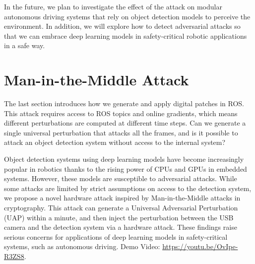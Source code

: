 In the future, we plan to investigate the effect of the attack on modular autonomous driving systems that rely on object detection models to perceive the environment. In addition, we will explore how to detect adversarial attacks so that we can embrace deep learning models in safety-critical robotic applications in a safe way.

\section{Man-in-the-Middle Attack}

The last section introduces how we generate and apply digital patches in ROS. This attack requires access to ROS topics and online gradients, which means different perturbations are computed at different time steps. Can we generate a single universal perturbation that attacks all the frames, and is it possible to attack an object detection system without access to the internal system? 


Object detection systems using deep learning models have become increasingly popular in robotics thanks to the rising power of CPUs and GPUs in embedded systems. However, these models are susceptible to adversarial attacks. While some attacks are limited by strict assumptions on access to the detection system, we propose a novel hardware attack inspired by Man-in-the-Middle attacks in cryptography. This attack can generate a Universal Adversarial Perturbation (UAP) within a minute, and then inject the perturbation between the USB camera and the detection system via a hardware attack. These findings raise serious concerns for applications of deep learning models in safety-critical systems, such as autonomous driving.
Demo Video: \href{https://youtu.be/OvIpe-R3ZS8}{https://youtu.be/OvIpe-R3ZS8}.

